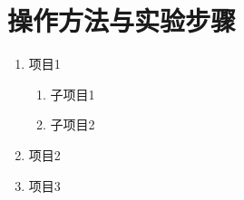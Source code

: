 
\section{操作方法与实验步骤}

\begin{enumerate}
    \item 项目1
    \begin{enumerate}
        \item 子项目1
        \item 子项目2
    \end{enumerate}
    \item 项目2
    \item 项目3
\end{enumerate}